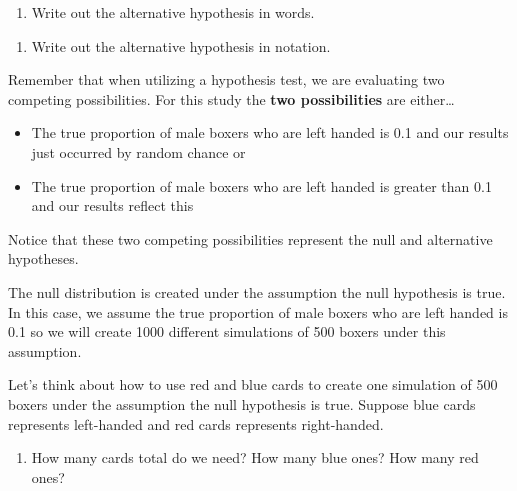 \documentclass[
]{report}
\providecommand{\tightlist}{%
  \setlength{\itemsep}{0pt}\setlength{\parskip}{0pt}}
\begin{document}
\begin{enumerate}
\def\labelenumi{\arabic{enumi}.}
\setcounter{enumi}{11}
\tightlist
\item
  Write out the alternative hypothesis in words.
\end{enumerate}

\vspace{1in}

\begin{enumerate}
\def\labelenumi{\arabic{enumi}.}
\setcounter{enumi}{12}
\tightlist
\item
  Write out the alternative hypothesis in notation.
\end{enumerate}

\vspace{0.5in}

Remember that when utilizing a hypothesis test, we are evaluating two competing possibilities. For this study the \textbf{two possibilities} are either\ldots{}

\begin{itemize}
\item
  The true proportion of male boxers who are left handed is 0.1 and our results just occurred by random chance or
\item
  The true proportion of male boxers who are left handed is greater than 0.1 and our results reflect this
\end{itemize}

Notice that these two competing possibilities represent the null and alternative hypotheses.

The null distribution is created under the assumption the null hypothesis is true. In this case, we assume the true proportion of male boxers who are left handed is 0.1 so we will create 1000 different simulations of 500 boxers under this assumption.

\newpage

Let's think about how to use red and blue cards to create one simulation of 500 boxers under the assumption the null hypothesis is true. Suppose blue cards represents left-handed and red cards represents right-handed.

\begin{enumerate}
\def\labelenumi{\arabic{enumi}.}
\setcounter{enumi}{13}
\tightlist
\item
  How many cards total do we need? How many blue ones? How many red ones?
\end{enumerate}

\vspace{0.5in}
\end{document}
